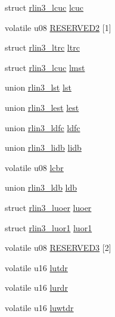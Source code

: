 \begin{DoxyCompactItemize}
\item 
struct \mbox{\hyperlink{structrlin3__lcuc}{rlin3\+\_\+lcuc}} \mbox{\hyperlink{structrlin3_a5aba5d30a8640e2b4d8bec239dfb16b2}{lcuc}}
\item 
volatile u08 \mbox{\hyperlink{structrlin3_af1fbc9182e34aa65f0de1bd52f869c11}{R\+E\+S\+E\+R\+V\+E\+D2}} \mbox{[}1\mbox{]}
\item 
struct \mbox{\hyperlink{structrlin3__ltrc}{rlin3\+\_\+ltrc}} \mbox{\hyperlink{structrlin3_a2933d590f740253fd706cebf4b9bc9a7}{ltrc}}
\item 
struct \mbox{\hyperlink{structrlin3__lcuc}{rlin3\+\_\+lcuc}} \mbox{\hyperlink{structrlin3_aae6a0694fdbc5496437d7f4f761015af}{lmst}}
\item 
union \mbox{\hyperlink{unionrlin3__lst}{rlin3\+\_\+lst}} \mbox{\hyperlink{structrlin3_a5c69bae9a814b0e734f7a439c826bb5e}{lst}}
\item 
union \mbox{\hyperlink{unionrlin3__lest}{rlin3\+\_\+lest}} \mbox{\hyperlink{structrlin3_a686c7a67d6b1bcff615887fd3e27438b}{lest}}
\item 
union \mbox{\hyperlink{unionrlin3__ldfc}{rlin3\+\_\+ldfc}} \mbox{\hyperlink{structrlin3_acd50cbf2726da01e5bfe880a57f92a30}{ldfc}}
\item 
union \mbox{\hyperlink{unionrlin3__lidb}{rlin3\+\_\+lidb}} \mbox{\hyperlink{structrlin3_abdfb9b77650ba3665124b8a558dc9f7d}{lidb}}
\item 
volatile u08 \mbox{\hyperlink{structrlin3_a899c44f01bc9809248ae1826a4722f6b}{lcbr}}
\item 
union \mbox{\hyperlink{unionrlin3__ldb}{rlin3\+\_\+ldb}} \mbox{\hyperlink{structrlin3_aa23b5a2d7c12d0e16ce447428e6aeaa8}{ldb}}
\item 
struct \mbox{\hyperlink{structrlin3__luoer}{rlin3\+\_\+luoer}} \mbox{\hyperlink{structrlin3_a931f6ea14e210e589f8711e61634a68f}{luoer}}
\item 
struct \mbox{\hyperlink{structrlin3__luor1}{rlin3\+\_\+luor1}} \mbox{\hyperlink{structrlin3_a335f7af24e40607a142da0553fc38179}{luor1}}
\item 
volatile u08 \mbox{\hyperlink{structrlin3_a1d31693daba1fa42088b549d16f8a9de}{R\+E\+S\+E\+R\+V\+E\+D3}} \mbox{[}2\mbox{]}
\item 
volatile u16 \mbox{\hyperlink{structrlin3_a91b49ab565401df41db4df12e386f99f}{lutdr}}
\item 
volatile u16 \mbox{\hyperlink{structrlin3_a4b45fc918c87227d0b4fe55d9d362642}{lurdr}}
\item 
volatile u16 \mbox{\hyperlink{structrlin3_a4c60077360aed953f12638df443f501d}{luwtdr}}
\end{DoxyCompactItemize}


